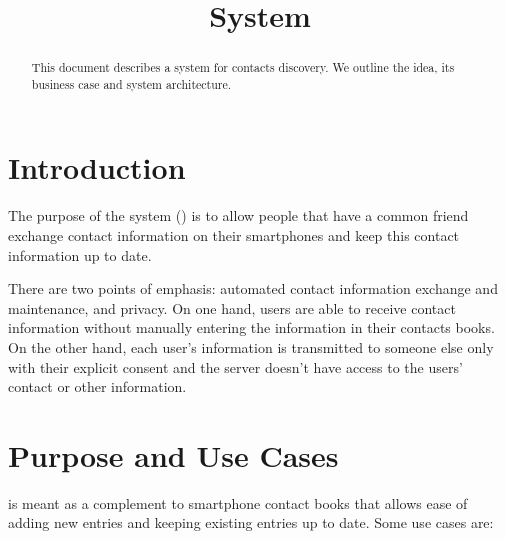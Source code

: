 \documentclass[a4paper, twoside, 10pt]{article}
\title{\longProduct{} System}
\author{\yannis}
\begin{document}
\maketitle

\begin{abstract}
This document describes a system for contacts discovery. We outline the idea, its business case and system architecture.
\end{abstract}

\tableofcontents

\section{Introduction}

The purpose of the \longProduct{} system (\commercialName{}) is to allow people that have a common friend exchange contact information on their smartphones and keep this contact 
information up to date.

There are two points of emphasis: automated contact information exchange and maintenance, and privacy. On one hand, users are able to receive contact information without manually 
entering the information in their contacts books. On the other hand, each user's information is transmitted to someone else only with their explicit consent and the server doesn't 
have access to the users' contact or other information.

\section{Purpose and Use Cases}

\commercialName{} is meant as a complement to smartphone contact books that allows ease of adding new entries and keeping existing entries up to date. Some use cases are:
\end{document}
